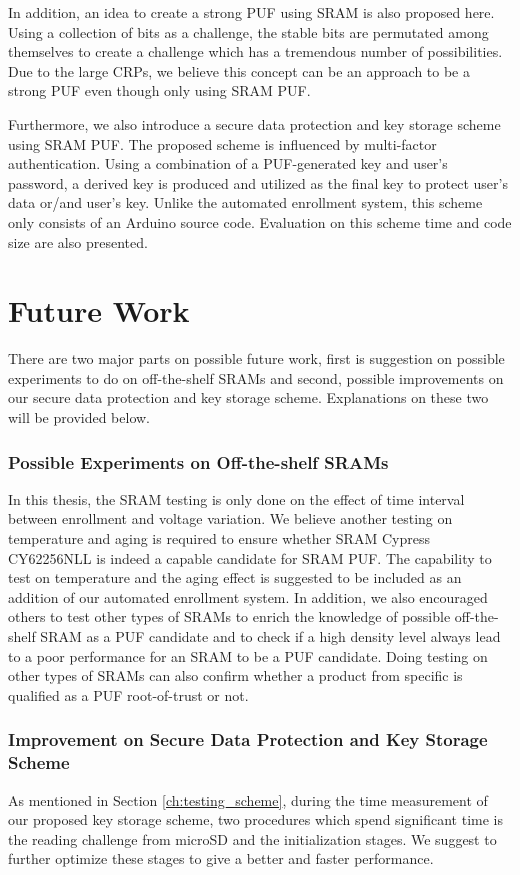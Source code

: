 In addition, an idea to create a strong PUF using SRAM is also proposed here. Using a collection of bits as a challenge, the stable bits are permutated among themselves to create a challenge which has a tremendous number of possibilities.
Due to the large CRPs, we believe this concept can be an approach to be a strong PUF even though only using SRAM PUF.

Furthermore, we also introduce a secure data protection and key storage scheme using SRAM PUF. The proposed scheme is influenced by multi-factor authentication. Using a combination of a PUF-generated key and user's password, a derived key is produced and utilized as the final key to protect user's data or/and user's key. Unlike the automated enrollment system, this scheme only consists of an Arduino source code. Evaluation on this scheme time and code size are also presented.

\section{Future Work}

There are two major parts on possible future work, first is suggestion on possible experiments to do on off-the-shelf SRAMs and second, possible improvements on our secure data protection and key storage scheme. Explanations on these two will be provided below.

\subsubsection{Possible Experiments on Off-the-shelf SRAMs}
In this thesis, the SRAM testing is only done on the effect of time interval between enrollment and voltage variation. We believe another testing on temperature and aging is required to ensure whether SRAM Cypress CY62256NLL is indeed a capable candidate for SRAM PUF. The capability to test on temperature and the aging effect is suggested to be included as an addition of our automated enrollment system.
In addition, we also encouraged others to test other types of SRAMs to enrich the knowledge of possible off-the-shelf SRAM as a PUF candidate and to check if a high density level always lead to a poor performance for an SRAM to be a PUF candidate. Doing testing on other types of SRAMs can also confirm whether a product from specific is qualified as a PUF root-of-trust or not.


\subsubsection{Improvement on Secure Data Protection and Key Storage Scheme}
As mentioned in Section \ref{ch:testing_scheme}, during the time measurement of our proposed key storage scheme, two procedures which spend significant time is the reading challenge from microSD and the initialization stages. We suggest to further optimize these stages to give a better and faster performance.

